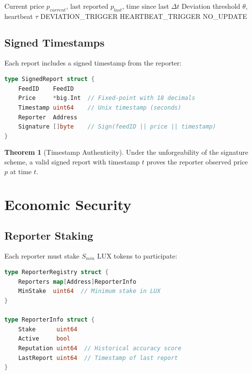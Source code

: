 \documentclass[11pt,a4paper]{article}
\theoremstyle{definition}
\newtheorem{theorem}{Theorem}
\begin{document}
\begin{algorithm}
\caption{Update Trigger}
\begin{algorithmic}[1]
\Require Current price $p_{current}$, last reported $p_{last}$, time since last $\Delta t$
\Require Deviation threshold $\theta$, heartbeat $\tau$
    \State \Return DEVIATION\_TRIGGER
    \State \Return HEARTBEAT\_TRIGGER
\Else
    \State \Return NO\_UPDATE
\EndIf
\end{algorithmic}
\end{algorithm}

\subsection{Signed Timestamps}

Each report includes a signed timestamp from the reporter:

\begin{lstlisting}[language=Go]
type SignedReport struct {
    FeedID    FeedID
    Price     *big.Int  // Fixed-point with 18 decimals
    Timestamp uint64    // Unix timestamp (seconds)
    Reporter  Address
    Signature []byte    // Sign(feedID || price || timestamp)
}
\end{lstlisting}

\begin{theorem}[Timestamp Authenticity]
Under the unforgeability of the signature scheme, a valid signed report with timestamp $t$ proves the reporter observed price $p$ at time $t$.
\end{theorem}

\section{Economic Security}

\subsection{Reporter Staking}

Each reporter must stake $S_{min}$ LUX tokens to participate:

\begin{lstlisting}[language=Go]
type ReporterRegistry struct {
    Reporters map[Address]ReporterInfo
    MinStake  uint64  // Minimum stake in LUX
}

type ReporterInfo struct {
    Stake      uint64
    Active     bool
    Reputation uint64  // Historical accuracy score
    LastReport uint64  // Timestamp of last report
}
\end{lstlisting}
\end{document}
